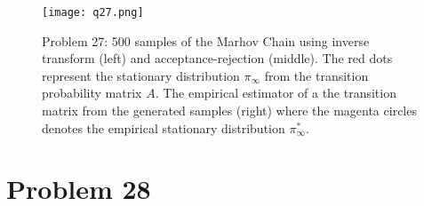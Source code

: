 \documentclass[a4paper, 11pt]{article}
\begin{document}
\begin{figure}
	\begin{center}
		\texttt{[image: q27.png]}
		\caption{Problem 27: 500 samples of the Marhov Chain using inverse transform (left) and acceptance-rejection (middle). The red dots represent the stationary distribution $\pi_\infty$ from the transition probability matrix $A$. The empirical estimator of a the transition matrix from the generated samples (right) where the magenta circles denotes the empirical stationary distribution $\pi^*_\infty$. }
	\end{center}
\end{figure}
\section*{Problem 28}
\end{document}
